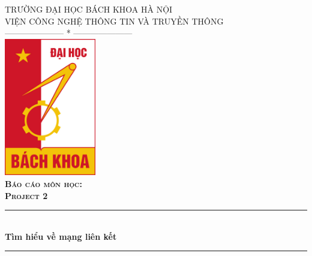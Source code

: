 \documentclass[../report.tex]{subfiles}
\begin{document}
\begin{titlepage}

\newcommand{\HRule}{\rule{\linewidth}{0.5mm}} %

\center %
\textsc{\Large TRƯỜNG ĐẠI HỌC BÁCH KHOA HÀ NỘI}\\[1cm] %
\textsc{\Large VIỆN CÔNG NGHỆ THÔNG TIN VÀ TRUYỀN THÔNG}\\[0.3cm]
\textsc{\Large ---------------------  *  ---------------------}\\[0.3cm]
\includegraphics[width=4cm]{hust.jpg}\\[1cm] %
 
\textsc{\large\bfseries Báo cáo môn học:} \\[0.2cm]
\textsc{\LARGE\bfseries Project 2}\\[1cm] %

\HRule \\[0.4cm]
{\Huge \bfseries Tìm hiểu về mạng liên kết}\\[0.3cm] %
\HRule \\[1.5cm]


\end{titlepage}
\end{document}
